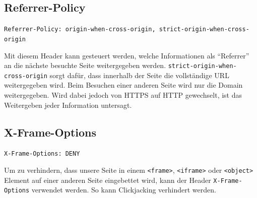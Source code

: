 \documentclass[12pt,DIV14,BCOR10mm,a4paper,parskip=half-,headsepline,headinclude,english,ngerman,bibliography=totocnumbered]{scrreprt}
\begin{document}
\subsection{Referrer-Policy}
\begin{sloppypar}
\texttt{Referrer-Policy: origin-when-cross-origin, strict-origin-when-cross-origin}
\end{sloppypar}
Mit diesem Header kann gesteuert werden, welche Informationen als \enquote{Referrer} an die nächste besuchte Seite weitergegeben werden. \texttt{strict-origin-when-cross-origin} sorgt dafür, dass innerhalb der Seite die vollständige URL weitergegeben wird. Beim Besuchen einer anderen Seite wird nur die Domain weitergegeben. Wird dabei jedoch von HTTPS auf HTTP gewechselt, ist das Weitergeben jeder Information untersagt.

\subsection{X-Frame-Options}
\begin{sloppypar}
\texttt{X-Frame-Options: DENY}
\end{sloppypar}
Um zu verhindern, dass unsere Seite in einem \texttt{<frame>}, \texttt{<iframe>} oder \texttt{<object>} Element auf einer anderen Seite eingebettet wird, kann der Header \texttt{X-Frame-Options} verwendet werden. So kann Clickjacking verhindert werden. %
\end{document}
